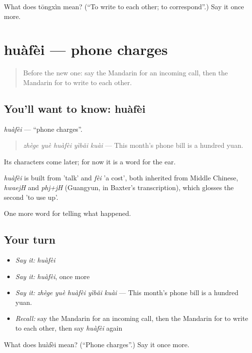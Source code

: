 \begin{tcolorbox}[breakable,colback=teal!4,colframe=teal!35!black,title={Before you move on}]
What does tōngxìn mean? (\textquotedblleft{}To write to each other; to correspond\textquotedblright{}.) Say it once more.
\end{tcolorbox}
\section[huàfèi]{huàfèi — phone charges}

\label{lesson:ZH-C319-huafei}



\begin{quote}
Before the new one: say the Mandarin for an incoming call, then the Mandarin for to write to each other.
\end{quote}

\subsection*{You'll want to know: huàfèi}
\emph{huàfèi} — \textquotedblleft{}phone charges\textquotedblright{}.

\begin{quote}
\emph{zhège yuè huàfèi yìbǎi kuài} — This month's phone bill is a hundred yuan.
\end{quote}

Its characters come later; for now it is a word for the ear.

\begin{cousinweb}
\emph{huàfèi} is built from  'talk' and \emph{fèi} 'a cost', both inherited from Middle Chinese, \emph{hwaejH} and \emph{phj+jH} (Guangyun, in Baxter's transcription), which glosses the second 'to use up'.
\end{cousinweb}

\begin{grammarlens}[title={What you've built}]
One more word for telling what happened.
\end{grammarlens}

\subsection*{Your turn}
\begin{itemize}
\raggedright
  \item \emph{Say it:} \emph{huàfèi}
  \item \emph{Say it:} \emph{huàfèi}, once more
  \item \emph{Say it:} \emph{zhège yuè huàfèi yìbǎi kuài} — This month's phone bill is a hundred yuan.
  \item \emph{Recall:} say the Mandarin for an incoming call, then the Mandarin for to write to each other, then say \emph{huàfèi} again
\end{itemize}

\begin{tcolorbox}[breakable,colback=teal!4,colframe=teal!35!black,title={Before you move on}]
What does huàfèi mean? (\textquotedblleft{}Phone charges\textquotedblright{}.) Say it once more.
\end{tcolorbox}
